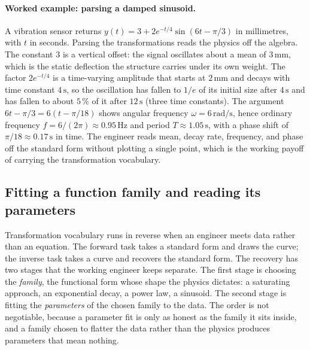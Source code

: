 \paragraph{Worked example: parsing a damped sinusoid.}
A vibration sensor returns $y(t) = 3 + 2 e^{-t/4} \sin(6t - \pi/3)$
in millimetres, with $t$ in seconds. Parsing the transformations
reads the physics off the algebra. The constant $3$ is a vertical
offset: the signal oscillates about a mean of $3\,\si{\milli\meter}$,
which is the static deflection the structure carries under its own
weight. The factor $2 e^{-t/4}$ is a time-varying amplitude that
starts at $2\,\si{\milli\meter}$ and decays with time constant
$4\,\si{\second}$, so the oscillation has fallen to $1/e$ of its
initial size after $4\,\si{\second}$ and has fallen to about $5\,\%$
of it after $12\,\si{\second}$ (three time constants). The argument $6t - \pi/3 = 6(t - \pi/18)$ shows
angular frequency $\omega = 6\,\si{\radian\per\second}$, hence
ordinary frequency $f = 6/(2\pi) \approx 0.95\,\si{\hertz}$ and
period $T \approx 1.05\,\si{\second}$, with a phase shift of
$\pi/18 \approx 0.17\,\si{\second}$ in time. The engineer reads
mean, decay rate, frequency, and phase off the standard form without
plotting a single point, which is the working payoff of carrying the
transformation vocabulary.

\subsection{Fitting a function family and reading its parameters}

Transformation vocabulary runs in reverse when an engineer meets data
rather than an equation. The forward task takes a standard form and
draws the curve; the inverse task takes a curve and recovers the
standard form. The recovery has two stages that the working engineer
keeps separate. The first stage is choosing the \emph{family}, the
functional form whose shape the physics dictates: a saturating
approach, an exponential decay, a power law, a sinusoid. The second
stage is fitting the \emph{parameters} of the chosen family to the
data. The order is not negotiable, because a parameter fit is only as
honest as the family it sits inside, and a family chosen to flatter
the data rather than the physics produces parameters that mean
nothing.



